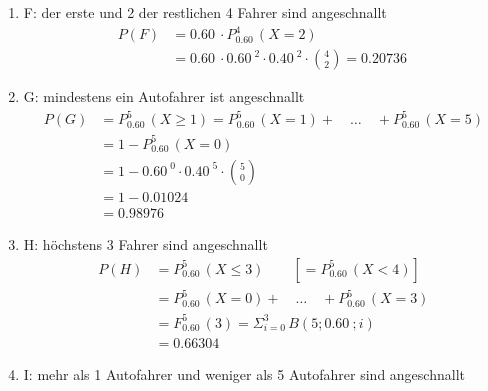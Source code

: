 \begin{Example}{}{}
\begin{enumerate}[label=\alph*),leftmargin=*]
{\begin{align*}
                &= \SI{0.60}{}^{3} \cdot \SI{0.40}{}^{2} \cdot \binom{5}{3} = \SI{0.3456}{}
            \end{align*}
            }
        \item[f)] {
            F: der erste und 2 der restlichen 4 Fahrer sind angeschnallt\\[-2.0ex]
            \begin{align*}
                P\left(F\right) &= \SI{0.60}{} \cdot P_{\SI{0.60}{}}^{4} \left(X = 2\right)\\
                &= \SI{0.60}{} \cdot \SI{0.60}{}^{2} \cdot \SI{0.40}{}^{2} \cdot \binom{4}{2} = \SI{0.20736}{}
            \end{align*}
            }
        \item[g)] {
            G: mindestens ein Autofahrer ist angeschnallt\\[-2.0ex]
            \begin{align*}
                P\left(G\right) &= P_{\SI{0.60}{}}^{5} \left(X \geq 1 \right) = P_{\SI{0.60}{}}^{5} \left(X = 1 \right) + \quad \dots \quad + P_{\SI{0.60}{}}^{5} \left(X = 5 \right) \\[1.5ex]
                &= 1 - P_{\SI{0.60}{}}^{5} \left(X = 0 \right) \\
                &= 1 - \SI{0.60}{}^{0} \cdot \SI{0.40}{}^{5} \cdot \binom{5}{0}\\
                &= 1 - \SI{0.01024}{}\\
                &= \SI{0.98976}{}
            \end{align*}
            }
        \item[h)] {
            H: höchstens 3 Fahrer sind angeschnallt\\[-2.0ex]
            \begin{align*}
                P\left(H\right) &= P_{\SI{0.60}{}}^{5} \left(X \leq 3 \right) \qquad \left[= P_{\SI{0.60}{}}^{5} \left(X < 4 \right)\right] \\[1.5ex]
                &= P_{\SI{0.60}{}}^{5} \left(X = 0 \right) + \quad \dots \quad + P_{\SI{0.60}{}}^{5} \left(X = 3 \right) \\[1.5ex]
                &= F_{\SI{0.60}{}}^{5}\left(3\right) = \displaystyle\Sigma_{i = 0}^{3} \, B(5; \SI{0.60}{}; i)\\[1.5ex]
                &= \SI{0.66304}{}
            \end{align*}
            }
        \item[i)] {
            I: mehr als 1 Autofahrer und weniger als 5 Autofahrer sind angeschnallt\\[-2.0ex]
}
\end{enumerate}
\end{Example}
